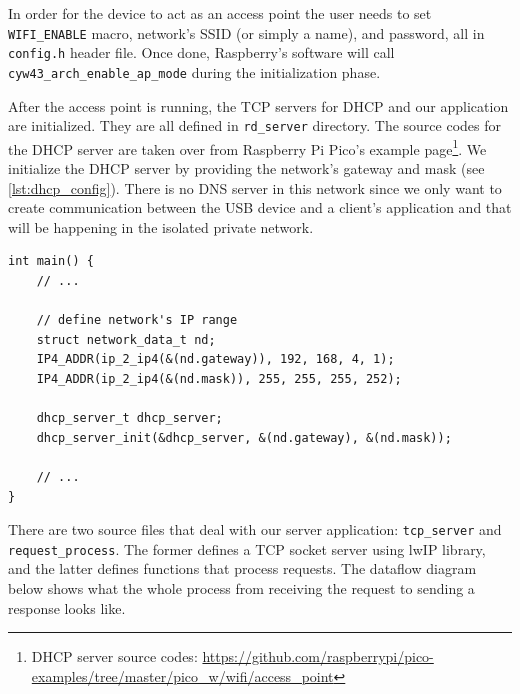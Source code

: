 In order for the device to act as an access point the user needs to set \verb|WIFI_ENABLE| macro, network's SSID (or simply a name), and password, all in \verb|config.h| header file. Once done, Raspberry's software will call \verb|cyw43_arch_enable_ap_mode| during the initialization phase.

After the access point is running, the TCP servers for DHCP and our application are initialized. They are all defined in \verb|rd_server| directory. The source codes for the DHCP server are taken over from Raspberry Pi Pico's example page\footnote{DHCP server source codes: \url{https://github.com/raspberrypi/pico-examples/tree/master/pico_w/wifi/access_point}}. We initialize the DHCP server by providing the network's gateway and mask (see \autoref{lst:dhcp_config}). There is no DNS server in this network since we only want to create communication between the USB device and a client's application and that will be happening in the isolated private network.

\begin{lstlisting}
int main() {
    // ...

    // define network's IP range
    struct network_data_t nd;
    IP4_ADDR(ip_2_ip4(&(nd.gateway)), 192, 168, 4, 1);
    IP4_ADDR(ip_2_ip4(&(nd.mask)), 255, 255, 255, 252);

    dhcp_server_t dhcp_server;
    dhcp_server_init(&dhcp_server, &(nd.gateway), &(nd.mask));

    // ...
}
\end{lstlisting}

There are two source files that deal with our server application: \verb|tcp_server| and \verb|request_process|. The former defines a TCP socket server using lwIP library, and the latter defines functions that process requests. The dataflow diagram  below shows what the whole process from receiving the request to sending a response looks like.

